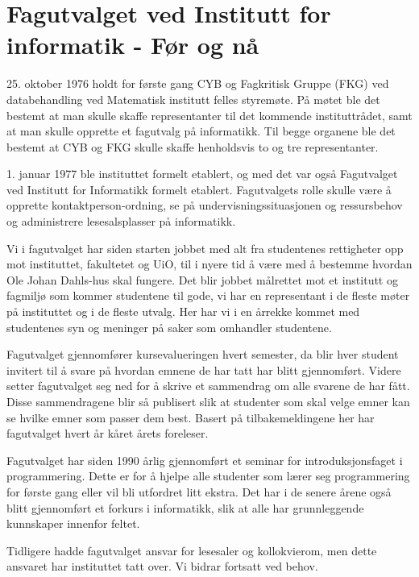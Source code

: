 \chapter[FUI]{Fagutvalget ved Institutt for informatik - Før og nå}

\author{Skrevet av Dennis Norheim}

25. oktober 1976 holdt for første gang CYB og Fagkritisk Gruppe (FKG) ved databehandling ved Matematisk institutt felles styremøte. På møtet ble det bestemt at man skulle skaffe representanter til det kommende instituttrådet, samt at man skulle opprette et fagutvalg på informatikk. Til begge organene ble det bestemt at CYB og FKG skulle skaffe henholdsvis to og tre representanter. 

1. januar 1977 ble instituttet formelt etablert, og med det var også Fagutvalget ved Institutt for Informatikk formelt etablert. Fagutvalgets rolle skulle være å opprette kontaktperson-ordning, se på undervisningssituasjonen og ressursbehov og administrere lesesalsplasser på informatikk.

Vi i fagutvalget har siden starten jobbet med alt fra studentenes rettigheter opp mot instituttet, fakultetet og UiO, til i nyere tid å være med å bestemme hvordan Ole Johan Dahls-hus skal fungere. Det blir jobbet målrettet mot et institutt og fagmiljø som kommer studentene til gode, vi har en representant i de fleste møter på instituttet og i de fleste utvalg. Her har vi i en årrekke kommet med studentenes syn og meninger på saker som omhandler studentene. 

Fagutvalget gjennomfører kursevalueringen hvert semester, da blir hver student invitert til å svare på hvordan emnene de har tatt har blitt gjennomført. Videre setter fagutvalget seg ned for å skrive et sammendrag om alle svarene de har fått. Disse sammendragene blir så publisert slik at studenter som skal velge emner kan se hvilke emner som passer dem best. Basert på tilbakemeldingene her har fagutvalget hvert år kåret årets foreleser. 

Fagutvalget har siden 1990 årlig gjennomført  et seminar for introduksjonsfaget i programmering. Dette er for å hjelpe alle studenter som lærer seg programmering for første gang eller vil bli utfordret litt ekstra. Det har i de senere årene også blitt gjennomført et forkurs i informatikk, slik at alle har grunnleggende kunnskaper innenfor feltet. 

Tidligere hadde fagutvalget ansvar for lesesaler og kollokvierom, men dette ansvaret har instituttet tatt over. Vi bidrar fortsatt ved behov. 
